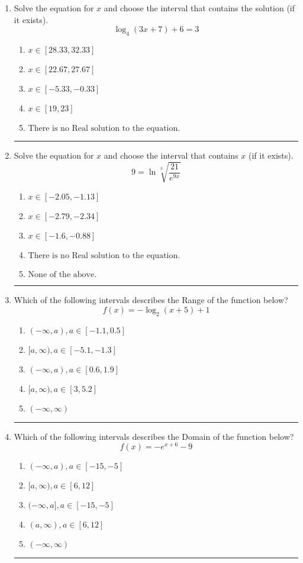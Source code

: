 \documentclass[14pt]{extbook}
\newcommand{\litem}[1]{\item#1\hspace*{-1cm}\rule{\textwidth}{0.4pt}}
\begin{document}
\begin{enumerate}
\litem{
Solve the equation for $x$ and choose the interval that contains the solution (if it exists).\[ \log_{4}{(3x+7)}+6 = 3 \]\begin{enumerate}[label=\Alph*.]
\item \( x \in [28.33, 32.33] \)
\item \( x \in [22.67, 27.67] \)
\item \( x \in [-5.33, -0.33] \)
\item \( x \in [19, 23] \)
\item \( \text{There is no Real solution to the equation.} \)

\end{enumerate} }
\litem{
 Solve the equation for $x$ and choose the interval that contains $x$ (if it exists).\[  9 = \ln{\sqrt[3]{\frac{21}{e^{9x}}}} \]\begin{enumerate}[label=\Alph*.]
\item \( x \in [-2.05, -1.13] \)
\item \( x \in [-2.79, -2.34] \)
\item \( x \in [-1.6, -0.88] \)
\item \( \text{There is no Real solution to the equation.} \)
\item \( \text{None of the above.} \)

\end{enumerate} }
\litem{
Which of the following intervals describes the Range of the function below?\[ f(x) = -\log_2{(x+5)}+1 \]\begin{enumerate}[label=\Alph*.]
\item \( (-\infty, a), a \in [-1.1, 0.5] \)
\item \( [a, \infty), a \in [-5.1, -1.3] \)
\item \( (-\infty, a), a \in [0.6, 1.9] \)
\item \( [a, \infty), a \in [3, 5.2] \)
\item \( (-\infty, \infty) \)

\end{enumerate} }
\litem{
Which of the following intervals describes the Domain of the function below?\[ f(x) = -e^{x+6}-9 \]\begin{enumerate}[label=\Alph*.]
\item \( (-\infty, a), a \in [-15, -5] \)
\item \( [a, \infty), a \in [6, 12] \)
\item \( (-\infty, a], a \in [-15, -5] \)
\item \( (a, \infty), a \in [6, 12] \)
\item \( (-\infty, \infty) \)


\end{enumerate}}
\end{enumerate}
\end{document}
